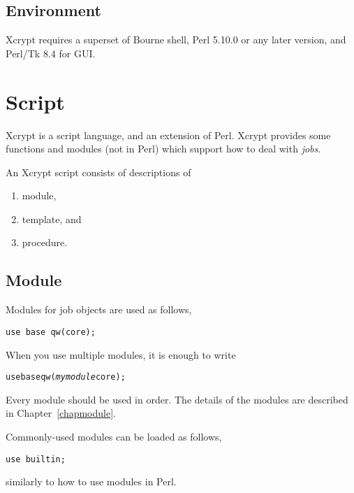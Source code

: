 \documentclass[a4paper,10pt]{report}
\begin{document}
\section{Environment}

Xcrypt requires a superset of Bourne shell, Perl 5.10.0 or any later
version, and Perl/Tk 8.4 for GUI.

\chapter{Script}

Xcrypt is a script language, and an extension of Perl.  Xcrypt provides
some functions and modules (not in Perl) which support how to deal
with \textit{jobs}.

An Xcrypt script consists of descriptions of
\begin{enumerate}
 \item module,
 \item template, and
 \item procedure.
\end{enumerate}

\section{Module}

Modules for job objects are used as follows,
\begin{boxnote}
\begin{verbatim}
use base qw(core);
\end{verbatim}
\end{boxnote}
\vspace{\baselineskip}

When you use multiple modules, it is enough to write
\begin{boxnote}
\begin{alltt}
use base qw(\textit{mymodule} core);
\end{alltt}
\end{boxnote}
\vspace{\baselineskip}
\noindent
Every module should be used in order.
The details of the modules are described in Chapter~\ref{chapmodule}.

Commonly-used modules can be loaded as follows,
\begin{boxnote}
\begin{verbatim}
use builtin;
\end{verbatim}
\end{boxnote}
\vspace{\baselineskip}
\noindent
similarly to how to use modules in Perl.
\end{document}

